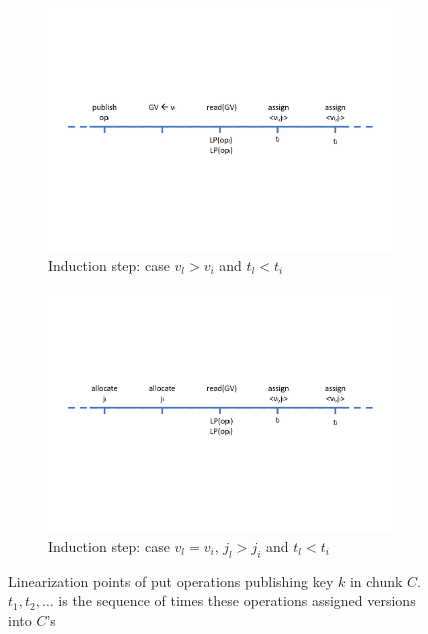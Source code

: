 \begin{figure}[tb]
\begin{subfigure}[t]{1.0\columnwidth}
      \includegraphics[scale=0.4]{proof-put-ind2.pdf}
      \caption[]{Induction step: case $v_l > v_i$ and $t_l<t_i$}
    \label{fig:proof-put-ind2}
  \end{subfigure}
  \begin{subfigure}[t]{1.0\columnwidth}
  \centering
      \includegraphics[scale=0.4]{proof-put-ind3.pdf}
      \caption[]{Induction step: case $v_l = v_i$, $j_l > j_i$ and $t_l<t_i$}
    \label{fig:proof-put-ind3}
  \end{subfigure}

\caption{Linearization points of put operations publishing key $k$ in chunk $C$. $t_1, t_2, \ldots $ is the sequence of times these operations assigned versions into $C$'s } 
\label{fig:proof-put}
\end{figure}


